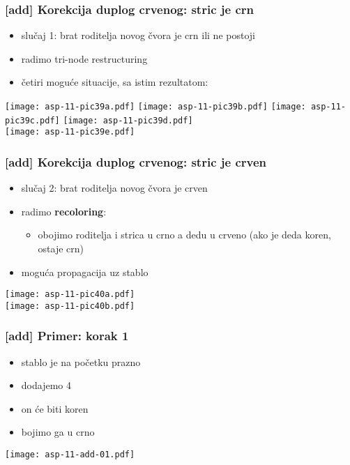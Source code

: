 \documentclass[compress,aspectratio=169]{beamer}
\begin{document}
\begin{frame}[fragile]
  \frametitle{[add] Korekcija duplog crvenog: stric je crn}
  \begin{itemize}
    \item slučaj 1: brat roditelja novog čvora je crn ili ne postoji
    \item radimo tri-node restructuring
    \item četiri moguće situacije, sa istim rezultatom:
  \end{itemize}
  \begin{center}
    \texttt{[image: asp-11-pic39a.pdf]}
    \texttt{[image: asp-11-pic39b.pdf]}
    \texttt{[image: asp-11-pic39c.pdf]}
    \texttt{[image: asp-11-pic39d.pdf]} \\
    \texttt{[image: asp-11-pic39e.pdf]}
  \end{center}
\end{frame}

\begin{frame}[fragile]
  \frametitle{[add] Korekcija duplog crvenog: stric je crven}
  \begin{itemize}
    \item slučaj 2: brat roditelja novog čvora je crven
    \item radimo \textbf{recoloring}:
    \begin{itemize}
      \item obojimo roditelja i strica u crno a dedu u crveno (ako je deda koren, ostaje crn)
    \end{itemize}
    \item moguća propagacija uz stablo
  \end{itemize}
  \texttt{[image: asp-11-pic40a.pdf]} \\
  \texttt{[image: asp-11-pic40b.pdf]}
\end{frame}

\begin{frame}[fragile]
  \frametitle{[add] Primer: korak 1}
  \begin{itemize}
    \item stablo je na početku prazno
    \item dodajemo 4
    \item on će biti koren
    \item bojimo ga u crno
  \end{itemize}
  \begin{center}
    \texttt{[image: asp-11-add-01.pdf]}
  \end{center}
\end{frame}
\end{document}
